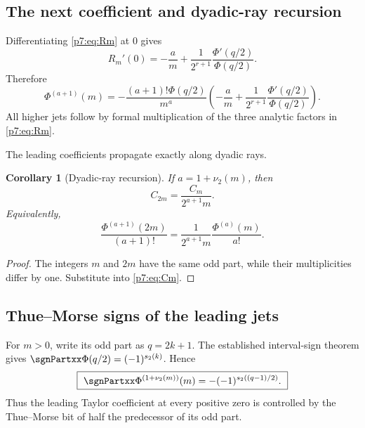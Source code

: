 \documentclass[11pt]{article}
\numberwithin{equation}{section}
\newtheorem{corollary}[theorem]{Corollary}
\theoremstyle{definition}
\theoremstyle{remark}
\begin{document}
\subsection{The next coefficient and dyadic-ray recursion}

Differentiating \cref{p7:eq:Rm} at $0$ gives
\begin{equation}\label{p7:eq:Rprime}
 R_m'(0)=-\frac{a}{m}
 +\frac1{2^{r+1}}\frac{\Phi'(q/2)}{\Phi(q/2)}.
\end{equation}
Therefore
\begin{equation}\label{p7:eq:next-jet}
 \Phi^{(a+1)}(m)
 =-\frac{(a+1)!\Phi(q/2)}{m^a}
 \left(-\frac{a}{m}
 +\frac1{2^{r+1}}\frac{\Phi'(q/2)}{\Phi(q/2)}\right).
\end{equation}
All higher jets follow by formal multiplication of the three analytic factors in \cref{p7:eq:Rm}.

The leading coefficients propagate exactly along dyadic rays.

\begin{corollary}[Dyadic-ray recursion]\label{p7:cor:dyadic-ray}
If $a=1+\nu_2(m)$, then
\begin{equation}\label{p7:eq:C-ray}
 C_{2m}=\frac{C_m}{2^{a+1}m}.
\end{equation}
Equivalently,
\begin{equation}\label{p7:eq:der-ray}
 \frac{\Phi^{(a+1)}(2m)}{(a+1)!}
 =\frac1{2^{a+1}m}\frac{\Phi^{(a)}(m)}{a!}.
\end{equation}
\end{corollary}

\begin{proof}
The integers $m$ and $2m$ have the same odd part, while their multiplicities differ by one.  Substitute into \cref{p7:eq:Cm}.
\end{proof}

\subsection{Thue--Morse signs of the leading jets}

For $m>0$, write its odd part as $q=2k+1$.  The established interval-sign theorem gives $\sgnPartxx\Phi(q/2)=(-1)^{s_2(k)}$.  Hence
\begin{equation}\label{p7:eq:jet-sign}
 \boxed{\ \sgnPartxx\Phi^{(1+\nu_2(m))}(m)
 =-(-1)^{s_2((q-1)/2)}.\ }
\end{equation}
Thus the leading Taylor coefficient at every positive zero is controlled by the Thue--Morse bit of half the predecessor of its odd part.
\end{document}
